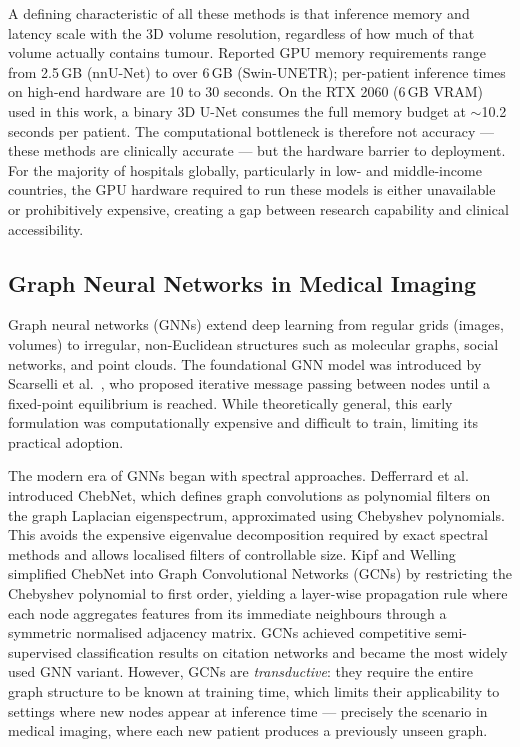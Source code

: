 \documentclass{article}
\begin{document}
A defining characteristic of all these methods is that inference memory and
latency scale with the 3D volume resolution, regardless of how much of that
volume actually contains tumour. Reported GPU memory requirements range from
2.5\,GB (nnU-Net) to over 6\,GB (Swin-UNETR); per-patient inference times on
high-end hardware are 10 to 30 seconds. On the RTX 2060 (6\,GB VRAM) used in
this work, a binary 3D U-Net consumes the full memory budget at $\sim$10.2
seconds per patient. The computational bottleneck is therefore not accuracy ---
these methods are clinically accurate --- but the hardware barrier to deployment.
For the majority of hospitals globally, particularly in low- and middle-income
countries, the GPU hardware required to run these models is either unavailable
or prohibitively expensive, creating a gap between research capability and
clinical accessibility.

\subsection{Graph Neural Networks in Medical Imaging}

Graph neural networks (GNNs) extend deep learning from regular grids
(images, volumes) to irregular, non-Euclidean structures such as molecular
graphs, social networks, and point clouds. The foundational GNN model was
introduced by Scarselli et al.\ \cite{scarselli2009graph}, who proposed
iterative message passing between nodes until a fixed-point equilibrium is
reached. While theoretically general, this early formulation was computationally
expensive and difficult to train, limiting its practical adoption.

The modern era of GNNs began with spectral approaches. Defferrard et al.\
\cite{defferrard2016convolutional} introduced ChebNet, which defines graph
convolutions as polynomial filters on the graph Laplacian eigenspectrum,
approximated using Chebyshev polynomials. This avoids the expensive eigenvalue
decomposition required by exact spectral methods and allows localised filters
of controllable size. Kipf and Welling \cite{kipf2017gcn} simplified ChebNet
into Graph Convolutional Networks (GCNs) by restricting the Chebyshev polynomial
to first order, yielding a layer-wise propagation rule where each node aggregates
features from its immediate neighbours through a symmetric normalised adjacency
matrix. GCNs achieved competitive semi-supervised classification results on
citation networks and became the most widely used GNN variant. However, GCNs
are \textit{transductive}: they require the entire graph structure to be known
at training time, which limits their applicability to settings where new nodes
appear at inference time --- precisely the scenario in medical imaging, where
each new patient produces a previously unseen graph.
\end{document}
